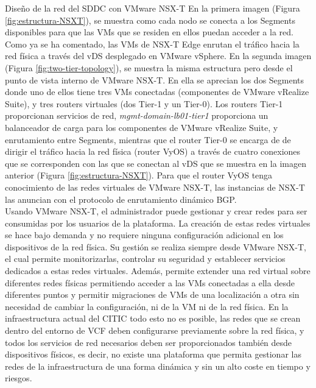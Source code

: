 \begin{subsubsection}{Diseño de la red del SDDC con VMware NSX-T}
    En la primera imagen (Figura \ref{fig:estructura-NSXT}), se muestra como cada nodo se conecta a los Segments disponibles para que las VMs que se residen en ellos puedan acceder a la red. Como ya se ha comentado, las VMs de NSX-T Edge enrutan el tráfico hacia la red física a través del vDS desplegado en VMware vSphere. En la segunda imagen (Figura \ref{fig:two-tier-topology}), se muestra la misma estructura pero desde el punto de vista interno de VMware NSX-T. En ella se aprecian los dos Segments donde uno de ellos tiene tres VMs conectadas (componentes de VMware vRealize Suite), y tres routers virtuales (dos Tier-1 y un Tier-0). Los routers Tier-1 proporcionan servicios de red, \textit{mgmt-domain-lb01-tier1} proporciona un balanceador de carga para los componentes de VMware vRealize Suite, y enrutamiento entre Segments, mientras que el router Tier-0 se encarga de de dirigir el tráfico hacia la red física (router VyOS) a través de cuatro conexiones que se corresponden con las que se conectan al vDS que se muestra en la imagen anterior (Figura \ref{fig:estructura-NSXT}). Para que el router VyOS tenga conocimiento de las redes virtuales de VMware NSX-T, las instancias de NSX-T las anuncian con el protocolo de enrutamiento dinámico BGP.
    \\
    Usando VMware NSX-T, el administrador puede gestionar y crear redes para ser consumidas por los usuarios de la plataforma. La creación de estas redes virtuales se hace bajo demanda y no requiere ninguna configuración adicional en los dispositivos de la red física. Su gestión se realiza siempre desde VMware NSX-T, el cual permite monitorizarlas, controlar su seguridad y establecer servicios dedicados a estas redes virtuales. Además, permite extender una red virtual sobre diferentes redes físicas permitiendo acceder a las VMs conectadas a ella desde diferentes puntos y permitir migraciones de VMs de una localización a otra sin necesidad de cambiar la configuración, ni de la VM ni de la red física. En la infraestructura actual del CITIC todo esto no es posible, las redes que se crean dentro del entorno de VCF deben configurarse previamente sobre la red física, y todos los servicios de red necesarios deben ser proporcionados también desde dispositivos físicos, es decir, no existe una plataforma que permita gestionar las redes de la infraestructura de una forma dinámica y sin un alto coste en tiempo y riesgos.
    
    
    

\end{subsubsection}
